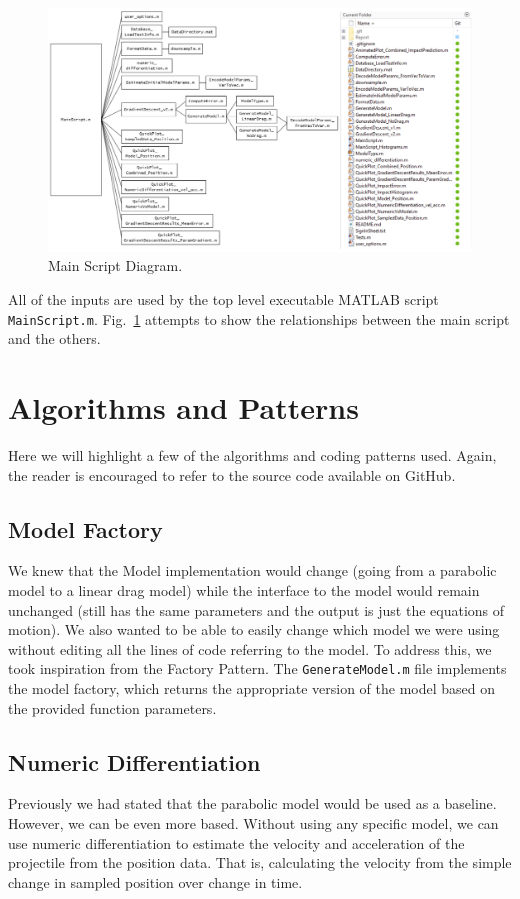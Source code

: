 \begin{figure}[t]
\centering
\includegraphics[width=0.9\linewidth]{images/MainScriptDiagram.png}
\caption{\label{fig:MainScriptDiagram} Main Script Diagram.}
\end{figure}

All of the inputs are used by the top level executable MATLAB script \texttt{MainScript.m}. Fig.~\ref{fig:MainScriptDiagram} attempts to show the relationships between the main script and the others. 

\section{Algorithms and Patterns}
Here we will highlight a few of the algorithms and coding patterns used. Again, the reader is encouraged to refer to the source code available on GitHub.

\subsection{Model Factory}
We knew that the Model implementation would change (going from a parabolic model to a linear drag model) while the interface to the model would remain unchanged (still has the same parameters and the output is just the equations of motion). We also wanted to be able to easily change which model we were using without editing all the lines of code referring to the model. To address this, we took inspiration from the Factory Pattern. The \texttt{GenerateModel.m} file implements the model factory, which returns the appropriate version of the model based on the provided function parameters.

\subsection{Numeric Differentiation}
Previously we had stated that the parabolic model would be used as a baseline. However, we can be even more based. Without using any specific model, we can use numeric differentiation to estimate the velocity and acceleration of the projectile from the position data. That is, calculating the velocity from the simple change in sampled position over change in time.

